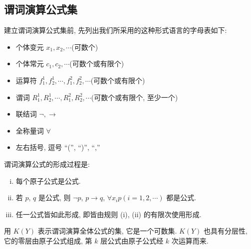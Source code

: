 \documentclass[
    mode=hazy,
    color=blue,
    device=normal,
    lang=cn
]{elegantnote}
\begin{document}
\subsection{谓词演算公式集}
建立谓词演算公式集前, 先列出我们所采用的这种形式语言的字母表如下:
\begin{itemize}[listparindent = 2em]
    \item 个体变元 $x_1, x_2, \cdots$\hfill (可数个)
    \item 个体常元 $c_1, c_2, \cdots$\hfill (可数个或有限个)
    \item 运算符 $f_1^1, f_2^1, \cdots, f_1^2, f_2^2, \cdots$\hfill (可数个或有限个)
    \item 谓词 $R_1^1, R_2^1, \cdots, R_1^2, R_2^2, \cdots$\hfill (可数个或有限个, 至少一个)
    \item 联结词 $\lnot, \to$
    \item 全称量词 $\forall$
    \item 左右括号, 逗号 ``('', ``)'', ``,''
\end{itemize}
谓词演算公式的形成过程是:
\begin{enumerate}[(i)]
    \item 每个原子公式是公式.
    \item 若 $p$, $q$ 是公式, 则 $\lnot p$, $p\to q$, $\forall x_i p(i = 1, 2, \cdots)$ 都是公式.
    \item 任一公式皆如此形成, 即皆由规则 (i), (ii) 的有限次使用形成.
\end{enumerate}
用 $K(Y)$ 表示谓词演算全体公式的集, 它是一个可数集. $K(Y)$ 也具有分层性, 它的零层由原子公式组成, 第 $k$ 层公式由原子公式经 $k$ 次运算而来.
\end{document}
